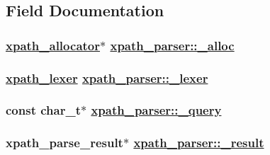 \subsection{Field Documentation}
\hypertarget{structxpath__parser_c34f5b21ef406bec944286eee2f45836}{
\subsubsection[\_\-alloc]{\setlength{\rightskip}{0pt plus 5cm}\hyperlink{classxpath__allocator}{xpath\_\-allocator}$\ast$ \hyperlink{structxpath__parser_c34f5b21ef406bec944286eee2f45836}{xpath\_\-parser::\_\-alloc}}}
\label{structxpath__parser_c34f5b21ef406bec944286eee2f45836}


\hypertarget{structxpath__parser_50106db584946e67acd080ef5391a0f4}{
\subsubsection[\_\-lexer]{\setlength{\rightskip}{0pt plus 5cm}\hyperlink{classxpath__lexer}{xpath\_\-lexer} \hyperlink{structxpath__parser_50106db584946e67acd080ef5391a0f4}{xpath\_\-parser::\_\-lexer}}}
\label{structxpath__parser_50106db584946e67acd080ef5391a0f4}


\hypertarget{structxpath__parser_af5ea5d5be97cdd93adc7a719d8edc1c}{
\subsubsection[\_\-query]{\setlength{\rightskip}{0pt plus 5cm}const char\_\-t$\ast$ \hyperlink{structxpath__parser_af5ea5d5be97cdd93adc7a719d8edc1c}{xpath\_\-parser::\_\-query}}}
\label{structxpath__parser_af5ea5d5be97cdd93adc7a719d8edc1c}


\hypertarget{structxpath__parser_9370fb875bfc49ca6e35f3165ecb1692}{
\subsubsection[\_\-result]{\setlength{\rightskip}{0pt plus 5cm}xpath\_\-parse\_\-result$\ast$ \hyperlink{structxpath__parser_9370fb875bfc49ca6e35f3165ecb1692}{xpath\_\-parser::\_\-result}}}
\label{structxpath__parser_9370fb875bfc49ca6e35f3165ecb1692}



